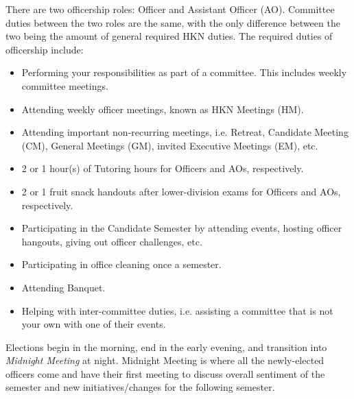 \documentclass[11pt, article, oneside]{memoir}
\begin{document}
        There are two officership roles: Officer and Assistant Officer (AO).
        Committee duties between the two roles are the same, with the only difference between the two being the amount of general required HKN duties.
        The required duties of officership include:
        \begin{itemize}
            \item
                Performing your responsibilities as part of a committee.
                This includes weekly committee meetings.
            \item
                Attending weekly officer meetings, known as HKN Meetings (HM).
            \item
                Attending important non-recurring meetings, i.e. Retreat, Candidate Meeting (CM), General Meetings (GM), invited Executive Meetings (EM), etc.
            \item
                2 or 1 hour(s) of Tutoring hours for Officers and AOs, respectively.
            \item
                2 or 1 fruit snack handouts after lower-division exams for Officers and AOs, respectively.
            \item
                Participating in the Candidate Semester by attending events, hosting officer hangouts, giving out officer challenges, etc.
            \item
                Participating in office cleaning once a semester.
            \item
                Attending Banquet.
            \item
                Helping with inter-committee duties, i.e. assisting a committee that is not your own with one of their events.
        \end{itemize}
        Elections begin in the morning, end in the early evening, and transition into \emph{Midnight Meeting} at night.
        Midnight Meeting is where all the newly-elected officers come and have their first meeting to discuss overall sentiment of the semester and new initiatives/changes for the following semester. \\
\end{document}
